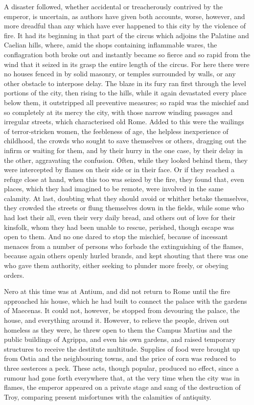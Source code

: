 
A disaster followed, whether accidental or treacherously contrived by the emperor, is uncertain, as authors have given both accounts, worse, however, and more dreadful than any which have ever happened to this city by the violence of fire. It had its beginning in that part of the circus which adjoins the Palatine and Caelian hills, where, amid the shops containing inflammable wares, the conflagration both broke out and instantly became so fierce and so rapid from the wind that it seized in its grasp the entire length of the circus. For here there were no houses fenced in by solid masonry, or temples surrounded by walls, or any other obstacle to interpose delay. The blaze in its fury ran first through the level portions of the city, then rising to the hills, while it again devastated every place below them, it outstripped all preventive measures; so rapid was the mischief and so completely at its mercy the city, with those narrow winding passages and irregular streets, which characterised old Rome. Added to this were the wailings of terror-stricken women, the feebleness of age, the helpless inexperience of childhood, the crowds who sought to save themselves or others, dragging out the infirm or waiting for them, and by their hurry in the one case, by their delay in the other, aggravating the confusion. Often, while they looked behind them, they were intercepted by flames on their side or in their face. Or if they reached a refuge close at hand, when this too was seized by the fire, they found that, even places, which they had imagined to be remote, were involved in the same calamity. At last, doubting what they should avoid or whither betake themselves, they crowded the streets or flung themselves down in the fields, while some who had lost their all, even their very daily bread, and others out of love for their kinsfolk, whom they had been unable to rescue, perished, though escape was open to them. And no one dared to stop the mischief, because of incessant menaces from a number of persons who forbade the extinguishing of the flames, because again others openly hurled brands, and kept shouting that there was one who gave them authority, either seeking to plunder more freely, or obeying orders.


Nero at this time was at Antium, and did not return to Rome until the fire approached his house, which he had built to connect the palace with the gardens of Maecenas. It could not, however, be stopped from devouring the palace, the house, and everything around it. However, to relieve the people, driven out homeless as they were, he threw open to them the Campus Martius and the public buildings of Agrippa, and even his own gardens, and raised temporary structures to receive the destitute multitude. Supplies of food were brought up from Ostia and the neighbouring towns, and the price of corn was reduced to three sesterces a peck. These acts, though popular, produced no effect, since a rumour had gone forth everywhere that, at the very time when the city was in flames, the emperor appeared on a private stage and sang of the destruction of Troy, comparing present misfortunes with the calamities of antiquity.

